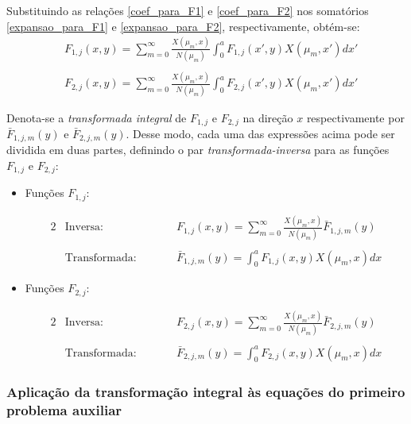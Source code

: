 Substituindo as relações \eqref{coef_para_F1} e \eqref{coef_para_F2} nos somatórios \eqref{expansao_para_F1} e \eqref{expansao_para_F2}, respectivamente, obtém-se:
\begin{align}
& F_{1, j}(x, y) = \sum_{m=0}^\infty \frac{X(\mu_m, x)}{N(\mu_m)}\int_0^a F_{1, j}(x', y)X(\mu_m, x')dx' \label{expansao_para_F1_nova}\\ \nonumber \\
& F_{2, j}(x, y) = \sum_{m=0}^\infty \frac{X(\mu_m, x)}{N(\mu_m)}\int_0^a F_{2, j}(x', y)X(\mu_m, x')dx' \label{expansao_para_F2_nova}
\end{align}

Denota-se a \textit{transformada integral} de $F_{1, j}$ e $F_{2, j}$ na direção $x$ respectivamente por $\bar{F}_{1,j,m}(y)$ e $\bar{F}_{2,j,m}(y)$.
Desse modo, cada uma das expressões acima pode ser dividida em duas partes, definindo o par \textit{transformada-inversa} para as funções $F_{1,j}$ e $F_{2,j}$:
\begin{itemize}
	\item Funções $F_{1, j}$:
	\begin{fleqn}
		\begin{alignat}{2}
		& \text{Inversa:} && F_{1, j}(x, y) = \sum_{m=0}^\infty \frac{X(\mu_m, x)}{N(\mu_m)}\bar{F}_{1,j,m}(y) \label{definicao_da_transf_inv_F1} \\ \nonumber \\
		& \text{Transformada:} \quad\quad && \bar{F}_{1,j,m}(y) = \int_0^a F_{1, j}(x, y) X(\mu_m, x) dx \label{definicao_da_transf_F1}
		\end{alignat}
	\end{fleqn}
	\item Funções $F_{2, j}$:
	\begin{fleqn}
		\begin{alignat}{2}
		& \text{Inversa:} && F_{2, j}(x, y) = \sum_{m=0}^\infty \frac{X(\mu_m, x)}{N(\mu_m)}\bar{F}_{2,j,m}(y) \label{definicao_da_transf_inv_F2} \\ \nonumber \\
		& \text{Transformada:} \quad\quad && \bar{F}_{2,j,m}(y) = \int_0^a F_{2, j}(x, y) X(\mu_m, x) dx
		\label{definicao_da_transf_F2}
		\end{alignat}
	\end{fleqn}
\end{itemize}

\subsubsection{Aplicação da transformação integral às equações do primeiro problema auxiliar}\label{secao_reciprocidade_F}

